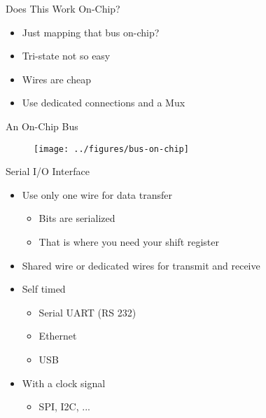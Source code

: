 \begin{frame}[fragile]{Does This Work On-Chip?}
\begin{itemize}
\item Just mapping that bus on-chip?
\item Tri-state not so easy
\item Wires are cheap
\item Use dedicated connections and a Mux
\end{itemize}
\end{frame}

\begin{frame}[fragile]{An On-Chip Bus}
\begin{figure}
  \texttt{[image: ../figures/bus-on-chip]}
\end{figure}
\end{frame}

\begin{frame}[fragile]{Serial I/O Interface}
\begin{itemize}
\item Use only one wire for data transfer
\begin{itemize}
\item Bits are serialized
\item That is where you need your shift register
\end{itemize}
\item Shared wire or dedicated wires for transmit and receive
\item Self timed
\begin{itemize}
\item Serial UART (RS 232)
\item Ethernet
\item USB
\end{itemize}
\item With a clock signal
\begin{itemize}
\item SPI, I2C, ...
\end{itemize}
\end{itemize}
\end{frame}



